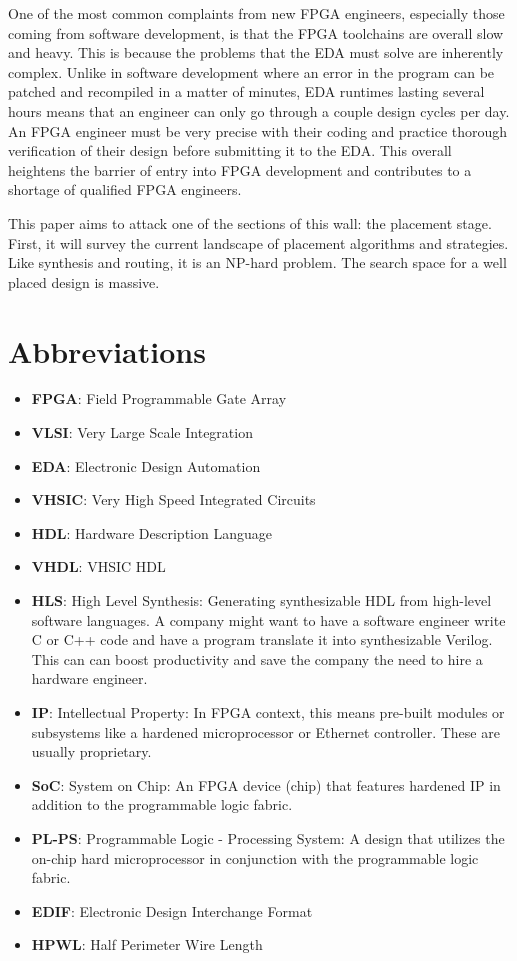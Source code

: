 \documentclass{article}
\begin{document}
One of the most common complaints from new FPGA engineers, especially those coming from software development, is that the FPGA toolchains are overall slow and heavy.
This is because the problems that the EDA must solve are inherently complex.
Unlike in software development where an error in the program can be patched and recompiled in a matter of minutes, EDA runtimes lasting several hours means that an engineer can only go through a couple design cycles per day. 
An FPGA engineer must be very precise with their coding and practice thorough verification of their design before submitting it to the EDA.
This overall heightens the barrier of entry into FPGA development and contributes to a shortage of qualified FPGA engineers. 

This paper aims to attack one of the sections of this wall: the placement stage. First, it will survey the current landscape of placement algorithms and strategies. Like synthesis and routing, it is an NP-hard problem. The search space for a well placed design is massive.

\section{Abbreviations}
\begin{itemize}[label={--}, left=0.25cm]
    \item \textbf{FPGA}: Field Programmable Gate Array
    \item \textbf{VLSI}: Very Large Scale Integration
    \item \textbf{EDA}: Electronic Design Automation
    \item \textbf{VHSIC}: Very High Speed Integrated Circuits
    \item \textbf{HDL}: Hardware Description Language
    \item \textbf{VHDL}: VHSIC HDL
    \item \textbf{HLS}: High Level Synthesis: Generating synthesizable HDL from high-level software languages. A company might want to have a software engineer write C or C++ code and have a program translate it into synthesizable Verilog. This can can boost productivity and save the company the need to hire a hardware engineer.
    \item \textbf{IP}: Intellectual Property: In FPGA context, this means pre-built modules or subsystems like a hardened microprocessor or Ethernet controller. These are usually proprietary.
    \item \textbf{SoC}: System on Chip: An FPGA device (chip) that features hardened IP in addition to the programmable logic fabric.
    \item \textbf{PL-PS}: Programmable Logic - Processing System: A design that utilizes the on-chip hard microprocessor in conjunction with the programmable logic fabric.
    \item \textbf{EDIF}: Electronic Design Interchange Format
    \item \textbf{HPWL}: Half Perimeter Wire Length
\end{itemize}
\end{document}
